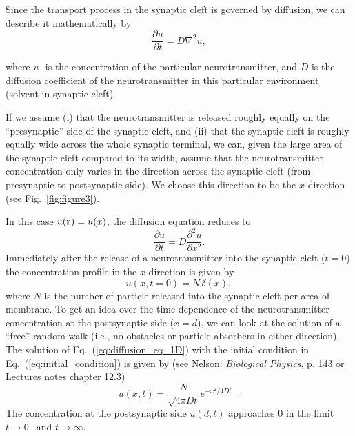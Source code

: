 \documentclass{article}
\begin{document}
Since the transport process in the synaptic cleft is governed by
diffusion, we can describe it mathematically by
%
\begin{equation}
\frac{\partial u}{\partial t} = D \nabla^2 u,
\label{eq:diffusion_eq_3D}
\end{equation}

where $u\,$ is the concentration of the particular neurotransmitter, and
$D$ is the diffusion coefficient of the neurotransmitter in this
particular environment (solvent in synaptic cleft).

If we assume (i) that the neurotransmitter is released
roughly equally on the ``presynaptic'' side of the synaptic cleft, and
(ii) that the synaptic cleft is roughly equally wide across the whole
synaptic terminal, we can, given the large area of the synaptic cleft
compared to its width, assume that the neurotransmitter concentration
only varies in the direction across the synaptic cleft (from
presynaptic to postsynaptic side). We choose this direction to be the
$x$-direction (see Fig.~\ref{fig:figure3}).

In this case $u({\bf r})=u(x)$, the diffusion equation
reduces to
%
\begin{equation}
\frac{\partial u}{\partial t} = D \frac{\partial^2 u}{\partial x^2}.
\label{eq:diffusion_eq_1D}
\end{equation}\newline
Immediately after the release of a neurotransmitter into the
synaptic cleft ($t=0$) the concentration profile in the $x$-direction
is given by
%
\begin{equation}
u(x,t=0) = N \, \delta(x),
\label{eq:initial_condition}
\end{equation}
%
where $N$ is the number of particle released into the synaptic cleft
per area of membrane.
To get an idea over the time-dependence of the neurotransmitter
concentration at the postsynaptic side ($x=d$), we can look at the
solution of a ``free'' random walk (i.e., no obstacles or particle
absorbers in either direction). The
solution of Eq.~(\ref{eq:diffusion_eq_1D}) with the initial condition
in Eq.~(\ref{eq:initial_condition}) is given by 
(see Nelson: \emph{Biological Physics}, p. 143 or Lectures notes chapter 12.3)
%
\begin{equation}
u(x,t) = \frac{N}{\sqrt{4 \pi D t}} e^{-x^2/4Dt}\;\;.
\label{eq:solution_delta_1D}
\end{equation}\newline
The concentration at the postsynaptic side $u(d,t)$
approaches 0 in the limit $t \rightarrow 0\;$ and
$t \rightarrow \infty$. 
\end{document}
